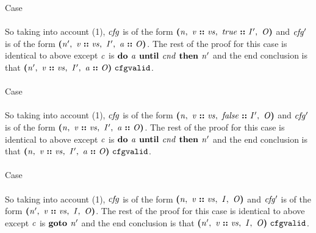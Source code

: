 \documentclass[12pt]{article}
\begin{document}
Case
\\
\\

So taking into account (1), $\mathit{cfg}$ is of the form
$\textbf{(}\mathit{n},\ \mathit{v}\ \textbf{::}\ \mathit{vs},\ \mathit{true}\ \textbf{::}\ \mathit{I'},\ \mathit{O}\textbf{)}$
and $\mathit{cfg'}$ is of the form
$\textbf{(}\mathit{n'},\ \mathit{v}\ \textbf{::}\ \mathit{vs},\ \mathit{I'},\ \mathit{a}\ \textbf{::}\ \mathit{O}\textbf{)}$.
The rest of the proof for this case is identical to above except $\mathit{c}$ is
$\textbf{do }\mathit{a}\textbf{ until }\mathit{cnd}\textbf{ then }\mathit{n'}$ and the end conclusion is that
$\textbf{(}\mathit{n'},\ \mathit{v}\ \textbf{::}\ \mathit{vs},\ \mathit{I'},\ \mathit{a}\ \textbf{::}\ \mathit{O}\textbf{)}\ \mathtt{cfgvalid}$.\\
\\

Case
\\
\\

So taking into account (1), $\mathit{cfg}$ is of the form
$\textbf{(}\mathit{n},\ \mathit{v}\ \textbf{::}\ \mathit{vs},\ \mathit{false}\ \textbf{::}\ \mathit{I'},\ \mathit{O}\textbf{)}$
and $\mathit{cfg'}$ is of the form
$\textbf{(}\mathit{n},\ \mathit{v}\ \textbf{::}\ \mathit{vs},\ \mathit{I'},\ \mathit{a}\ \textbf{::}\ \mathit{O}\textbf{)}$.
The rest of the proof for this case is identical to above except $\mathit{c}$ is
$\textbf{do }\mathit{a}\textbf{ until }\mathit{cnd}\textbf{ then }\mathit{n'}$ and the end conclusion is that
$\textbf{(}\mathit{n},\ \mathit{v}\ \textbf{::}\ \mathit{vs},\ \mathit{I'},\ \mathit{a}\ \textbf{::}\ \mathit{O}\textbf{)}\ \mathtt{cfgvalid}$.\\
\\

Case
\\
\\

So taking into account (1), $\mathit{cfg}$ is of the form
$\textbf{(}\mathit{n},\ \mathit{v}\ \textbf{::}\ \mathit{vs},\ \mathit{I},\ \mathit{O}\textbf{)}$
and $\mathit{cfg'}$ is of the form
$\textbf{(}\mathit{n'},\ \mathit{v}\ \textbf{::}\ \mathit{vs},\ \mathit{I},\ \mathit{O}\textbf{)}$.
The rest of the proof for this case is identical to above except $\mathit{c}$ is
$\textbf{goto }\mathit{n'}$ and the end conclusion is that
$\textbf{(}\mathit{n'},\ \mathit{v}\ \textbf{::}\ \mathit{vs},\ \mathit{I},\ \mathit{O}\textbf{)}\ \mathtt{cfgvalid}$.\\
\\
\end{document}
